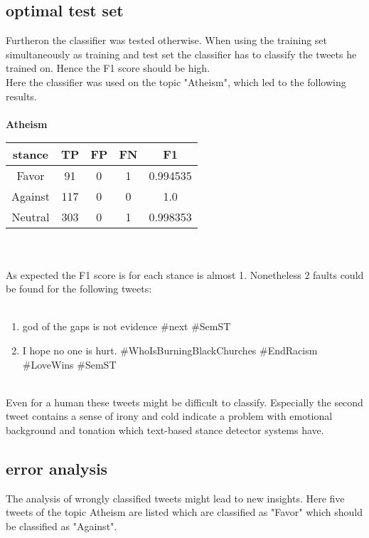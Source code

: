 \documentclass[a4paper,12pt,twoside]{article}
\begin{document}
\subsection{optimal test set}
Furtheron the classifier was tested otherwise. When using the training set simultaneously as training and test set the classifier has to classify the tweets he trained on. Hence the F1 score should be high.\\
Here the classifier was used on the topic "Atheism", which led to the following results. \\
\\
\textbf{Atheism}
\\
\begin{tabular}{c|ccc|c}
stance & TP & FP & FN & F1\\ \hline
Favor & 91 & 0 & 1 & 0.994535\\
Against & 117 & 0 & 0 & 1.0\\
Neutral &  303 & 0 & 1 & 0.998353\\
\end{tabular}\\
\\
As expected the F1 score is for each stance is almost 1. Nonetheless 2 faults could be found for the following tweets:\\
\\
\begin{enumerate}
\item god of the gaps is not evidence \#next \#SemST\\
\item I hope no one is hurt. \#WhoIsBurningBlackChurches \#EndRacism \#LoveWins \#SemST\\
\\
\end{enumerate}
Even for a human these tweets might be difficult to classify. Especially the second tweet contains a sense of irony and cold indicate a problem with emotional background and tonation which text-based stance detector systems have. 

\subsection{error analysis}

The analysis of wrongly classified tweets might lead to new insights.
Here five tweets of the topic Atheism are listed which are classified as "Favor" which should be classified as "Against". 
\end{document}
